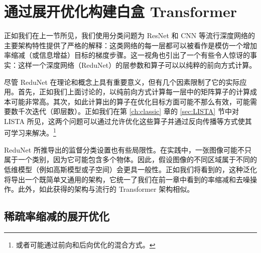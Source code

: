 \documentclass[../../book-main.tex]{subfiles}
\begin{document}
\section{通过展开优化构建白盒 Transformer}\label{sec:chap4-white-box-transformer}
正如我们在上一节所见，我们使用分类问题为 ResNet 和 CNN 等流行深度网络的主要架构特性提供了严格的解释：这类网络的每一层都可以被看作是模仿一个增加率缩减（或信息增益）目标的梯度步骤。这一视角也引出了一个有些令人惊讶的事实：这样一个深度网络（ReduNet）的层参数和算子可以以纯粹的前向方式计算。

尽管 ReduNet 在理论和概念上具有重要意义，但有几个因素限制了它的实际应用。首先，正如我们上面讨论的，以纯前向方式计算每一层中的矩阵算子的计算成本可能非常高。其次，如此计算出的算子在优化目标方面可能不那么有效，可能需要数千次迭代（即层数）。正如我们在第 \ref{ch:classic} 章的 \ref{sec:LISTA} 节中对 LISTA 所见，这两个问题可以通过允许优化这些算子并通过反向传播等方式使其可学习来解决。\footnote{或者可能通过前向和后向优化的混合方式。}

ReduNet 所推导出的监督分类设置也有些局限性。在实践中，一张图像可能不只属于一个类别，因为它可能包含多个物体。因此，假设图像的不同区域属于不同的低维模型（例如高斯模型或子空间）会更具一般性。正如我们将看到的，这种泛化将导出一个既简单又通用的架构，它统一了我们在前一章中看到的率缩减和去噪操作。此外，如此获得的架构与流行的 Transformer 架构相似。



\subsection{稀疏率缩减的展开优化}


\end{document}
